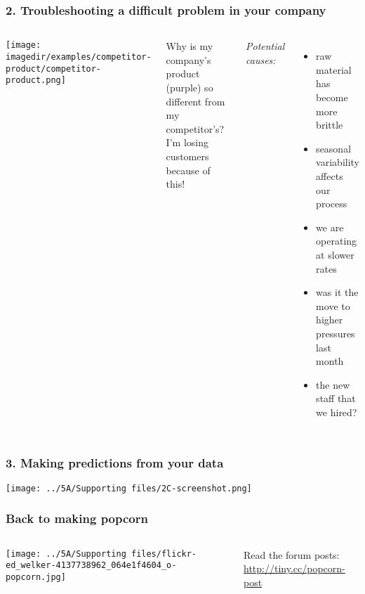 \begin{frame}\frametitle{2. Troubleshooting a difficult problem in your company}
	\begin{columns}[T]
			\texttt{[image: \\imagedir/examples/competitor-product/competitor-product.png]}
			
			
			Why is {\color{purple} my company's product (purple)} so different from my {\color{red} competitor's}? \\
			I'm losing customers because of this!
			
			\vspace{0.5cm}
			{\color{blue}\emph{Potential causes:}}
			\begin{itemize}
				\item	raw material has become more brittle
				\item	seasonal variability affects our process
				\item	we are operating at slower rates
				\item	was it the move to higher pressures last month
				\item	the new staff that we hired?
			\end{itemize}
			
	\end{columns}
\end{frame}

\begin{frame}\frametitle{3. Making predictions from your data}
	\texttt{[image: ../5A/Supporting files/2C-screenshot.png]}
\end{frame}

\begin{frame}\frametitle{Back to making popcorn}
	\begin{columns}[T]
			\texttt{[image: ../5A/Supporting files/flickr-ed\_welker-4137738962\_064e1f4604\_o-popcorn.jpg]}

			
			\vspace{5cm}
			{\small Read the forum posts: \href{http://tiny.cc/popcorn-post}{http://tiny.cc/popcorn-post}}
	\end{columns}
	
\end{frame}

